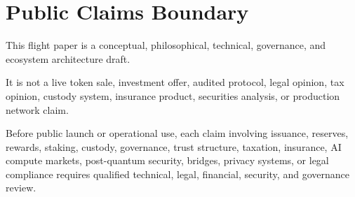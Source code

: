 ﻿\documentclass[12pt]{article}
\begin{document}
\section{Public Claims Boundary}


This flight paper is a conceptual, philosophical, technical, governance, and ecosystem architecture draft.

It is not a live token sale, investment offer, audited protocol, legal opinion, tax opinion, custody system, insurance product, securities analysis, or production network claim.

Before public launch or operational use, each claim involving issuance, reserves, rewards, staking, custody, governance, trust structure, taxation, insurance, AI compute markets, post-quantum security, bridges, privacy systems, or legal compliance requires qualified technical, legal, financial, security, and governance review.

\aftClosingPage
\end{document}
